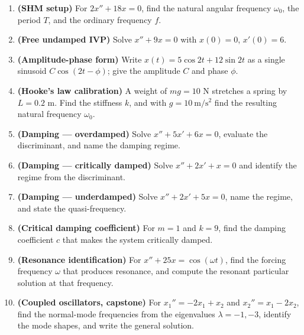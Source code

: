 \begin{enumerate}[leftmargin=2em]
    \item \textbf{(SHM setup)} For $2x'' + 18x = 0$, find the natural angular
          frequency $\omega_0$, the period $T$, and the ordinary frequency $f$.

    \item \textbf{(Free undamped IVP)} Solve $x'' + 9x = 0$ with $x(0)=0$,
          $x'(0)=6$.

    \item \textbf{(Amplitude-phase form)} Write $x(t) = 5\cos 2t + 12\sin 2t$ as a
          single sinusoid $C\cos(2t-\phi)$; give the amplitude $C$ and phase $\phi$.

    \item \textbf{(Hooke's law calibration)} A weight of $mg = 10$ N stretches a
          spring by $L = 0.2$ m. Find the stiffness $k$, and with $g=10\ \mathrm{m/s^2}$
          find the resulting natural frequency $\omega_0$.

    \item \textbf{(Damping --- overdamped)} Solve $x'' + 5x' + 6x = 0$, evaluate the
          discriminant, and name the damping regime.

    \item \textbf{(Damping --- critically damped)} Solve $x'' + 2x' + x = 0$ and
          identify the regime from the discriminant.

    \item \textbf{(Damping --- underdamped)} Solve $x'' + 2x' + 5x = 0$, name the
          regime, and state the quasi-frequency.

    \item \textbf{(Critical damping coefficient)} For $m=1$ and $k=9$, find the
          damping coefficient $c$ that makes the system critically damped.

    \item \textbf{(Resonance identification)} For $x'' + 25x = \cos(\omega t)$,
          find the forcing frequency $\omega$ that produces resonance, and compute
          the resonant particular solution at that frequency.

    \item \textbf{(Coupled oscillators, capstone)} For
          $x_1'' = -2x_1 + x_2$ and $x_2'' = x_1 - 2x_2$, find the normal-mode
          frequencies from the eigenvalues $\lambda = -1, -3$, identify the mode
          shapes, and write the general solution.
\end{enumerate}

